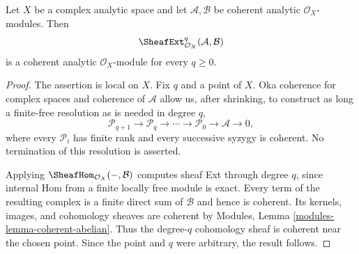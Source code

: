 \begin{lemma}
\label{lemma-coherent-analytic-sheaf-ext}
Let $X$ be a complex analytic space and let $\mathcal A,\mathcal B$ be
coherent analytic $\mathcal O_X$-modules. Then
$$
\SheafExt^q_{\mathcal O_X}(\mathcal A,\mathcal B)
$$
is a coherent analytic $\mathcal O_X$-module for every $q\geq 0$.
\end{lemma}

\begin{proof}
The assertion is local on $X$. Fix $q$ and a point of $X$. Oka coherence for
complex spaces and coherence of $\mathcal A$ allow us, after shrinking, to
construct as long a finite-free resolution as is needed in degree $q$,
$$
\mathcal P_{q+1}\longrightarrow\mathcal P_q\longrightarrow\cdots
\longrightarrow\mathcal P_0\longrightarrow\mathcal A\longrightarrow 0,
$$
where every $\mathcal P_i$ has finite rank and every successive syzygy is
coherent. No termination of this resolution is asserted.

Applying $\SheafHom_{\mathcal O_X}(-,\mathcal B)$ computes sheaf Ext through
degree $q$, since internal Hom from a finite locally free module is exact.
Every term of the resulting complex is a finite direct sum of $\mathcal B$
and hence is coherent. Its kernels, images, and cohomology sheaves are
coherent by Modules, Lemma \ref{modules-lemma-coherent-abelian}. Thus the
degree-$q$ cohomology sheaf is coherent near the chosen point. Since the point
and $q$ were arbitrary, the result follows.
\end{proof}

